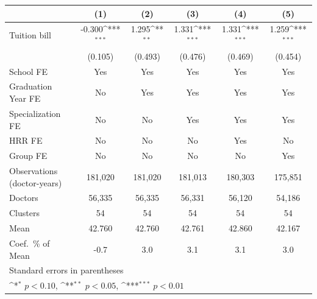 {
\def\sym#1{\ifmmode^{#1}\else\(^{#1}\)\fi}
\begin{tabular}{l*{5}{c}}
\hline\hline
                    &\multicolumn{1}{c}{(1)}         &\multicolumn{1}{c}{(2)}         &\multicolumn{1}{c}{(3)}         &\multicolumn{1}{c}{(4)}         &\multicolumn{1}{c}{(5)}         \\
\hline
Tuition bill        &      -0.300\sym{***}&       1.295\sym{**} &       1.331\sym{***}&       1.331\sym{***}&       1.259\sym{***}\\
                    &     (0.105)         &     (0.493)         &     (0.476)         &     (0.469)         &     (0.454)         \\
[1em]
School FE           &         Yes         &         Yes         &         Yes         &         Yes         &         Yes         \\
[1em]
Graduation Year FE  &          No         &         Yes         &         Yes         &         Yes         &         Yes         \\
[1em]
Specialization FE   &          No         &          No         &         Yes         &         Yes         &         Yes         \\
[1em]
HRR FE              &          No         &          No         &          No         &         Yes         &          No         \\
[1em]
Group FE            &          No         &          No         &          No         &          No         &         Yes         \\
\hline
Observations (doctor-years)&     181,020         &     181,020         &     181,013         &     180,303         &     175,851         \\
Doctors             &      56,335         &      56,335         &      56,331         &      56,120         &      54,186         \\
Clusters            &          54         &          54         &          54         &          54         &          54         \\
Mean                &      42.760         &      42.760         &      42.761         &      42.860         &      42.167         \\
Coef.\ \% of Mean   &        -0.7         &         3.0         &         3.1         &         3.1         &         3.0         \\
\hline\hline
\multicolumn{6}{l}{\footnotesize Standard errors in parentheses}\\
\multicolumn{6}{l}{\footnotesize \sym{*} \(p<0.10\), \sym{**} \(p<0.05\), \sym{***} \(p<0.01\)}\\
\end{tabular}
}
